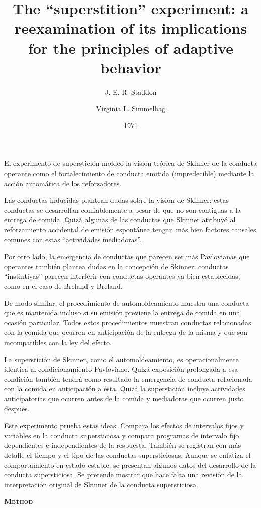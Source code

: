 \documentclass[a4paper,12pt]{article}
\title{The ``superstition'' experiment: a reexamination of its implications for the principles of adaptive behavior}
\author{J. E. R. Staddon \and Virginia L. Simmelhag}
\date{1971}
\begin{document}
{\scshape\bfseries \maketitle}

El experimento de superstición moldeó la visión teórica de Skinner de la conducta operante como el fortalecimiento de conducta emitida (impredecible) mediante la acción automática de los reforzadores. 

Las conductas inducidas plantean dudas sobre la visión de Skinner: estas conductas se desarrollan confiablemente  a pesar de que no son contiguas a la entrega de comida. Quizá algunas de las conductas que Skinner atribuyó al reforzamiento accidental de emisión espontánea tengan más bien factores causales comunes con estas ``actividades mediadoras''.

Por otro lado, la emergencia de conductas que parecen ser más Pavlovianas que operantes también plantea dudas en la concepción de Skinner: conductas ``instintivas'' parecen interferir con conductas operantes ya bien establecidas, como en el caso de Breland y Breland.

De modo similar, el procedimiento de automoldeamiento muestra una conducta que es mantenida incluso si su emisión previene la entrega de comida en una ocasión particular. Todos estos procedimientos muestran conductas relacionadas con la comida que ocurren en anticipación de la entrega de la misma y que son incompatibles con la ley del efecto.

La superstición de Skinner, como el automoldeamiento, es operacionalmente idéntica al condicionamiento Pavloviano. Quizá exposición prolongada a esa condición también tendrá como resultado la emergencia de conducta relacionada con la comida en anticipación a ésta. Quizá la superstición incluye actividades anticipatorias que ocurren antes de la comida y mediadoras que ocurren justo después.

Este experimento prueba estas ideas. Compara los efectos de intervalos fijos y variables en la conducta supersticiosa y compara programas de intervalo fijo dependientes e independientes de la respuesta. También se registran con más detalle el tiempo y el tipo de las conductas supersticiosas. Aunque se enfatiza el comportamiento en estado estable, se presentan algunos datos del desarrollo de la conducta supersticiosa. Se pretende mostrar que hace falta una revisión de la interpretación original de Skinner de la conducta supersticiosa.

{\scshape\bfseries Method}
\end{document}
